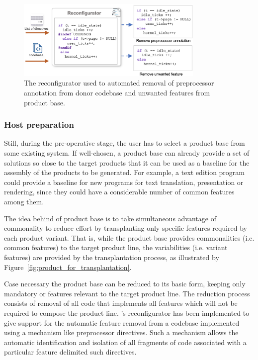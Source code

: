 \begin{figure}[t]
	\centering \includegraphics[width=9cm]{images/reconfigurator.png}
	\centering 
	\caption{The reconfigurator used to automated removal of preprocessor annotation from donor codebase and unwanted features from product base.}
	\label{fig:reconfigurator}
\end{figure} 

\subsubsection{Host preparation}

Still, during the pre-operative stage, the user has to select a product base from some existing system. If well-chosen, a product base can already provide a set of solutions so close to the target products that it can be used as a baseline for the assembly of the products to be generated. For example, a text edition program could provide a baseline for new programs for text translation,  presentation or rendering, since they could have a considerable number of common features among them.

The idea behind of product base is to take simultaneous advantage of commonality to reduce effort by transplanting only specific features required by each product variant. That is, while the product base provides commonalities (i.e. common features) to the target product line, the variabilities (i.e. variant features) are provided by the transplantation process, as illustrated by Figure~\ref{fig:product_for_transplantation}.

Case necessary the product base can be reduced to its basic form, keeping only mandatory or features relevant to the target product line. The reduction process consists of removal of all code that implements all features which will not be required to compose the product line. \autoscalpel's reconfigurator has been implemented to give support for the automatic feature removal from a codebase implemented using a mechanism like preprocessor directives. Such a mechanism allows the automatic identification and isolation of all fragments of code associated with a particular feature delimited such directives. 


